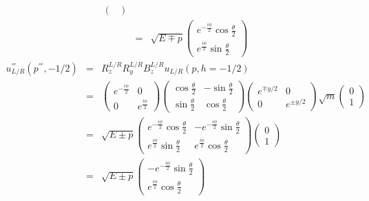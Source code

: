 \documentclass[11pt]{article}
\begin{document}
\begin{itemize}
\begin{eqnarray}
\begin{pmatrix}
        \end{pmatrix} \\
        &=& \sqrt{E\mp p}
        \begin{pmatrix}
            e^{-\frac{i\phi}{2}} \cos \frac{\theta}{2} \\
            e^{\frac{i\phi}{2}} \sin \frac{\theta}{2}
        \end{pmatrix}
   \end{eqnarray}
   \begin{eqnarray}
    u^{'''}_{L/R}(p^{'''},-1/2)&=&R_z^{L/R} R_y^{L/R} B_z^{L/R} u_{L/R}(p,h=-1/2) \\
    &=&
    \begin{pmatrix}
        e^{-\frac{i\phi}{2}} & 0 \\
        0 & e^{\frac{i\phi}{2}}
    \end{pmatrix}
    \begin{pmatrix}
        \cos \frac{\theta}{2} & -\sin \frac{\theta}{2} \\
        \sin \frac{\theta}{2} & \cos \frac{\theta}{2}
    \end{pmatrix}
    \begin{pmatrix}
        e^{\mp y/2} & 0\\
        0 & e^{\pm y/2}
    \end{pmatrix}
    \sqrt{m}
    \begin{pmatrix}
        0 \\ 1
    \end{pmatrix}\\
    &=& \sqrt{E\pm p}
    \begin{pmatrix}
        e^{-\frac{i\phi}{2}} \cos \frac{\theta}{2}   &  - e^{-\frac{i\phi}{2}} \sin \frac{\theta}{2} \\
        e^{\frac{i\phi}{2}} \sin \frac{\theta}{2} & e^{\frac{i\phi}{2}} \cos \frac{\theta}{2}
    \end{pmatrix}
    \begin{pmatrix}
        0 \\ 1
    \end{pmatrix} \\
    &=& \sqrt{E\pm p}
    \begin{pmatrix}
        -e^{-\frac{i\phi}{2}} \sin \frac{\theta}{2} \\
        e^{\frac{i\phi}{2}} \cos \frac{\theta}{2}
    \end{pmatrix}
\end{eqnarray}
\end{itemize}
\end{document}
